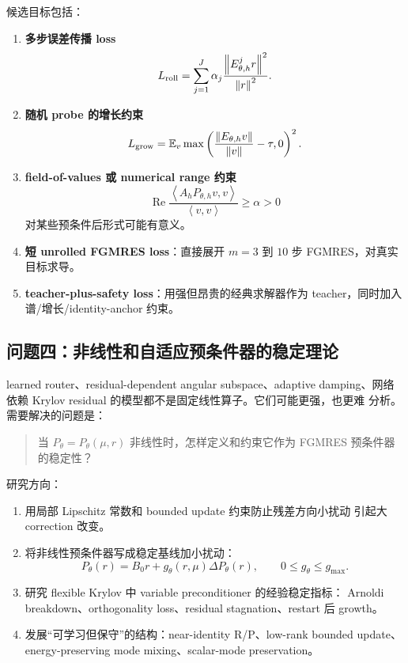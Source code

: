 \documentclass[UTF8,11pt,fontset=fandol]{ctexart}
\newcommand{\norm}[1]{\left\lVert #1 \right\rVert}
\newcommand{\inner}[2]{\left\langle #1,#2\right\rangle}
\begin{document}
候选目标包括：
\begin{enumerate}[leftmargin=2em]
  \item \textbf{多步误差传播 loss}
  \[
    L_{\rm roll}
    =
    \sum_{j=1}^{J} \alpha_j
    \frac{\norm{E_{\theta,h}^j r}^2}{\norm r^2}.
  \]
  \item \textbf{随机 probe 的增长约束}
  \[
    L_{\rm grow}
    =
    \mathbb{E}_{v}
    \max\left(
      \frac{\norm{E_{\theta,h}v}}{\norm v}-\tau,0
    \right)^2.
  \]
  \item \textbf{field-of-values 或 numerical range 约束}
  \[
    \operatorname{Re}
    \frac{\inner{A_hP_{\theta,h}v}{v}}{\inner{v}{v}}
    \ge \alpha >0
  \]
  对某些预条件后形式可能有意义。
  \item \textbf{短 unrolled FGMRES loss}：直接展开 \(m=3\) 到 \(10\) 步
  FGMRES，对真实目标求导。
  \item \textbf{teacher-plus-safety loss}：用强但昂贵的经典求解器作为
  teacher，同时加入谱/增长/identity-anchor 约束。
\end{enumerate}

\subsection{问题四：非线性和自适应预条件器的稳定理论}

learned router、residual-dependent angular subspace、adaptive damping、网络
依赖 Krylov residual 的模型都不是固定线性算子。它们可能更强，也更难
分析。需要解决的问题是：
\begin{quote}
  当 \(P_\theta=P_\theta(\mu,r)\) 非线性时，怎样定义和约束它作为 FGMRES
  预条件器的稳定性？
\end{quote}

研究方向：
\begin{enumerate}[leftmargin=2em]
  \item 用局部 Lipschitz 常数和 bounded update 约束防止残差方向小扰动
  引起大 correction 改变。
  \item 将非线性预条件器写成稳定基线加小扰动：
  \[
    P_\theta(r)=B_0r+g_\theta(r,\mu)\Delta P_\theta(r),
    \qquad 0\le g_\theta\le g_{\max}.
  \]
  \item 研究 flexible Krylov 中 variable preconditioner 的经验稳定指标：
  Arnoldi breakdown、orthogonality loss、residual stagnation、restart 后
  growth。
  \item 发展“可学习但保守”的结构：near-identity R/P、low-rank bounded
  update、energy-preserving mode mixing、scalar-mode preservation。
\end{enumerate}
\end{document}
